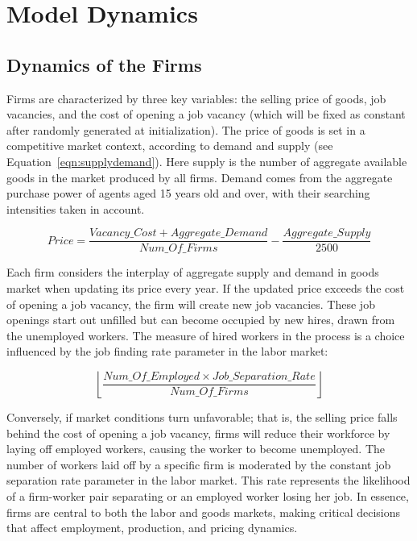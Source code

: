\documentclass[ %
    final,
    scrbook,
    listoffigures,
    listoftables, 
    glossary]{cu-thesis}
\begin{document}
\section{Model Dynamics}
\subsection{Dynamics of the Firms}
Firms are characterized by three key variables: the selling price of goods, job vacancies, and the cost of opening a job vacancy (which will be fixed as constant after randomly generated at initialization). The price of goods is set in a competitive market context, according to demand and supply (see Equation~\ref{eqn:supplydemand}). Here supply is the number of aggregate available goods in the market produced by all firms. Demand comes from the aggregate purchase power of agents aged 15 years old and over, with their searching intensities taken in account. 

\begin{equation} \label{eqn:supplydemand}
Price = \frac{Vacancy\_Cost + Aggregate\_Demand}{Num\_Of\_Firms} - \frac{Aggregate\_Supply}{2500}
\end{equation}

Each firm considers the interplay of aggregate supply and demand in goods market when updating its price every year. If the updated price exceeds the cost of opening a job vacancy, the firm will create new job vacancies. These job openings start out unfilled but can become occupied by new hires, drawn from the unemployed workers.  The measure of hired workers in the process is a choice influenced by the job finding rate parameter in the labor market:

\begin{equation*}
\left\lfloor\frac{Num\_Of\_Employed \times Job\_Separation\_Rate}{Num\_Of\_Firms}\right\rfloor
\end{equation*}

Conversely, if market conditions turn unfavorable; that is, the selling price falls behind the cost of opening a job vacancy, firms will reduce their workforce by laying off employed workers, causing the worker to become unemployed.
The number of workers laid off by a specific firm is moderated by the constant job separation rate parameter in the labor market. This rate represents the likelihood of a firm-worker pair separating or an employed worker losing her job. In essence, firms are central to both the labor and goods markets, making critical decisions that affect employment, production, and pricing dynamics.
\end{document}
